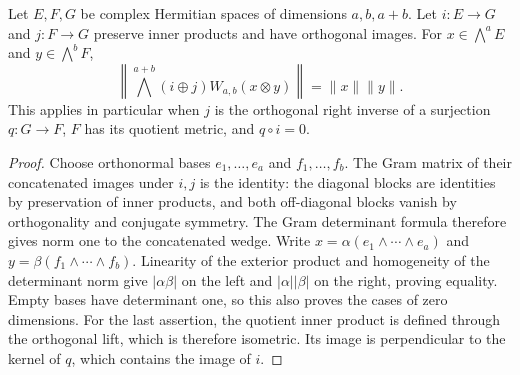 \begin{lemma}
\label{lem:orthogonal-determinant-norm}
\leanok
Let $E,F,G$ be complex Hermitian spaces of dimensions $a,b,a+b$.
Let $i:E\to G$ and $j:F\to G$ preserve inner products and have
orthogonal images. For $x\in\bigwedge^a E$ and $y\in\bigwedge^b F$,
\[
 \left\|\bigwedge^{a+b}(i\mathbin{\oplus}j)
                 W_{a,b}(x\otimes y)\right\|=\|x\|\|y\|.
\]
This applies in particular when $j$ is the orthogonal right inverse of a
surjection $q:G\to F$, $F$ has its quotient metric, and $q\circ i=0$.
\end{lemma}
\begin{proof}
Choose orthonormal bases $e_1,\ldots,e_a$ and $f_1,\ldots,f_b$.
The Gram matrix of their concatenated images under $i,j$ is the identity:
the diagonal blocks are identities by preservation of inner products, and
both off-diagonal blocks vanish by orthogonality and conjugate symmetry.
The Gram determinant formula therefore gives norm one to the concatenated
wedge. Write $x=\alpha(e_1\wedge\cdots\wedge e_a)$ and
$y=\beta(f_1\wedge\cdots\wedge f_b)$. Linearity of the exterior product
and homogeneity of the determinant norm give $|\alpha\beta|$ on the
left and $|\alpha||\beta|$ on the right, proving equality. Empty bases
have determinant one, so this also proves the cases of zero dimensions.
For the last assertion, the quotient inner product is defined through the
orthogonal lift, which is therefore isometric. Its image is perpendicular
to the kernel of $q$, which contains the image of $i$.
\end{proof}

